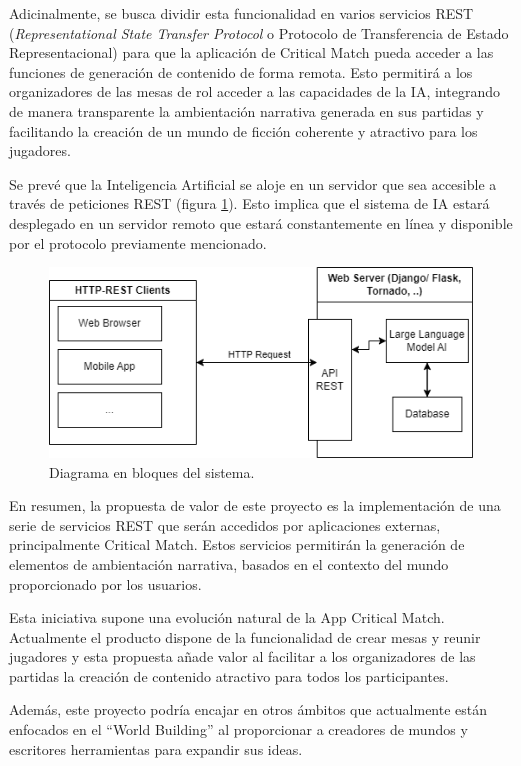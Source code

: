 \documentclass[
11pt, %
]{Clases/charter}
\begin{document}
Adicinalmente, se busca dividir esta funcionalidad en varios servicios REST
(\textit{Representational State Transfer Protocol} o Protocolo de Transferencia de Estado Representacional)
para que la aplicación de Critical Match pueda acceder a las funciones de generación de contenido de forma remota.
Esto permitirá a los organizadores de las mesas de rol acceder a las capacidades de la IA,
integrando de manera transparente la ambientación narrativa generada en sus partidas y facilitando la creación de un mundo de ficción coherente y atractivo para los jugadores.

Se prevé que la Inteligencia Artificial se aloje en un servidor que sea accesible a través de peticiones REST (figura \ref{fig:diagBloques}).
Esto implica que el sistema de IA estará desplegado en un servidor remoto que estará constantemente en línea y disponible por el protocolo previamente mencionado.

\begin{figure}[htpb]
	\centering
	\includegraphics[scale=0.75]{./Figuras/diagBloques.png}
	\caption{Diagrama en bloques del sistema.}
	\label{fig:diagBloques}
\end{figure}
\vspace{25px}

En resumen, la propuesta de valor de este proyecto es la implementación de una serie de servicios REST que serán accedidos por aplicaciones externas,
principalmente Critical Match. Estos servicios permitirán la generación de elementos de ambientación narrativa, basados en el contexto del mundo proporcionado por los usuarios.

Esta iniciativa supone una evolución natural de la App Critical Match.
Actualmente el producto dispone de la funcionalidad de crear mesas y reunir jugadores y esta propuesta añade valor al facilitar a los organizadores de las partidas la creación de contenido atractivo para todos los participantes.

Además, este proyecto podría encajar en otros ámbitos que actualmente están enfocados en el “World Building” al proporcionar a creadores de mundos y escritores herramientas para expandir sus ideas.
\end{document}
